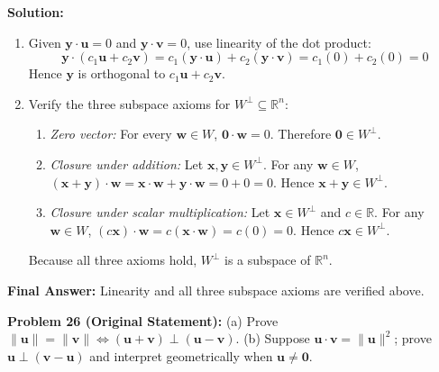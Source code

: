 \documentclass[11pt, letterpaper]{article}
\theoremstyle{definition}
\theoremstyle{remark}
\begin{document}
\textbf{Solution:}
\begin{enumerate}[label=(\alph*)]
    \item Given $\mathbf{y} \cdot \mathbf{u} = 0$ and $\mathbf{y} \cdot \mathbf{v} = 0$, use linearity of the dot product:
    \[
    \mathbf{y} \cdot (c_1\mathbf{u} + c_2\mathbf{v}) = c_1(\mathbf{y} \cdot \mathbf{u}) + c_2(\mathbf{y} \cdot \mathbf{v}) = c_1(0) + c_2(0) = 0
    \]
    Hence $\mathbf{y}$ is orthogonal to $c_1\mathbf{u} + c_2\mathbf{v}$.
    \item Verify the three subspace axioms for $W^{\perp} \subseteq \mathbb{R}^n$:
    \begin{enumerate}[label=\arabic*.]
        \item \textit{Zero vector:} For every $\mathbf{w} \in W$, $\mathbf{0} \cdot \mathbf{w} = 0$. Therefore $\mathbf{0} \in W^{\perp}$.
        \item \textit{Closure under addition:} Let $\mathbf{x}, \mathbf{y} \in W^{\perp}$. For any $\mathbf{w} \in W$, $(\mathbf{x} + \mathbf{y}) \cdot \mathbf{w} = \mathbf{x} \cdot \mathbf{w} + \mathbf{y} \cdot \mathbf{w} = 0 + 0 = 0$. Hence $\mathbf{x} + \mathbf{y} \in W^{\perp}$.
        \item \textit{Closure under scalar multiplication:} Let $\mathbf{x} \in W^{\perp}$ and $c \in \mathbb{R}$. For any $\mathbf{w} \in W$, $(c\mathbf{x}) \cdot \mathbf{w} = c(\mathbf{x} \cdot \mathbf{w}) = c(0) = 0$. Hence $c\mathbf{x} \in W^{\perp}$.
    \end{enumerate}
    Because all three axioms hold, $W^{\perp}$ is a subspace of $\mathbb{R}^n$.
\end{enumerate}
\textbf{Final Answer:} Linearity and all three subspace axioms are verified above.

\medskip
\textbf{Problem 26 (Original Statement):} (a) Prove $\|\mathbf{u}\| = \|\mathbf{v}\| \iff (\mathbf{u} + \mathbf{v}) \perp (\mathbf{u} - \mathbf{v})$. (b) Suppose $\mathbf{u} \cdot \mathbf{v} = \|\mathbf{u}\|^2$; prove $\mathbf{u} \perp (\mathbf{v} - \mathbf{u})$ and interpret geometrically when $\mathbf{u} \neq \mathbf{0}$.
\end{document}
